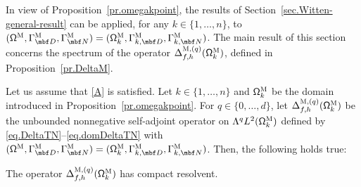 \label{sec.specM}

In view of Proposition~\ref{pr.omegakpoint}, the results of Section~\ref{sec.Witten-general-result} can be applied, for any
$k\in\{1,\ldots,n\}$, to $(\mathsf \Omega^{\textsc{M}}, \Gamma^{\textsc{M}}_{\mbf D}, \Gamma^{\textsc{M}}_{\mbf N}) = (\mathsf \Omega_k^{\textsc{M}}, \Gamma_{k,\mbf D}^{\textsc{M}}, \Gamma_{k,\mbf N}^{\textsc{M}})$.
The main result of this section concerns the spectrum of the operator
$\Delta_{f,h}^{\textsc{M}, (q)} (\mathsf \Omega_k^{\textsc{M}})$,
defined in Proposition~\ref{pr.DeltaM}.

\begin{proposition}
\label{pr.DeltaTN}
Let us assume that \ref{A} is satisfied. Let
$k\in\{1,\ldots,n\}$ and $ \mathsf \Omega_k^{\textsc{M}} $ be the
domain introduced in Proposition~\ref{pr.omegakpoint}. For $q\in\{0,\ldots,d\}$, let $\Delta_{f,h}^{\textsc{M}, (q)}(\mathsf \Omega_k^{\textsc{M}})$ be the unbounded
nonnegative self-adjoint operator on
$ \Lambda^qL^{2} (\mathsf \Omega_k^{\textsc{M}})$ defined by \eqref{eq.DeltaTN}--\eqref{eq.domDeltaTN} with $(\mathsf \Omega^{\textsc{M}}, \Gamma^{\textsc{M}}_{\mbf D}, \Gamma^{\textsc{M}}_{\mbf N}) = (\mathsf \Omega_k^{\textsc{M}}, \Gamma_{k,\mbf D}^{\textsc{M}}, \Gamma_{k,\mbf N}^{\textsc{M}})$.
Then, the following holds true:
\begin{enumeratei}
\item\label{pr.DeltaTNi}
The operator $\Delta_{f,h}^{\textsc{M},(q)} (\mathsf \Omega_k^{\textsc{M}})$ has compact resolvent.


\end{enumeratei}
\end{proposition}
